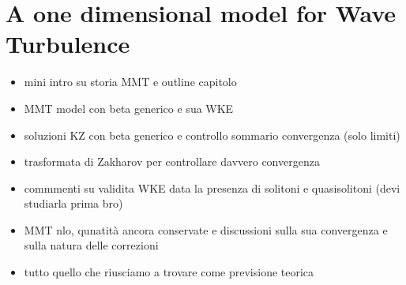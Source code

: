 

\newpage
\vphantom{}
\section{A one dimensional model for Wave Turbulence}

\begin{itemize}
    \item mini intro su storia MMT e outline capitolo
    \item MMT model con beta generico e sua WKE
    \item soluzioni KZ con beta generico e controllo sommario convergenza (solo limiti)
    \item trasformata di Zakharov per controllare davvero convergenza
    \item commmenti su validita WKE data la presenza di solitoni e quasisolitoni (devi studiarla prima bro)
    \item MMT nlo, qunatità ancora conservate e discussioni sulla sua convergenza e sulla natura delle correzioni
    \item tutto quello che riusciamo a trovare come previsione teorica 
\end{itemize}


